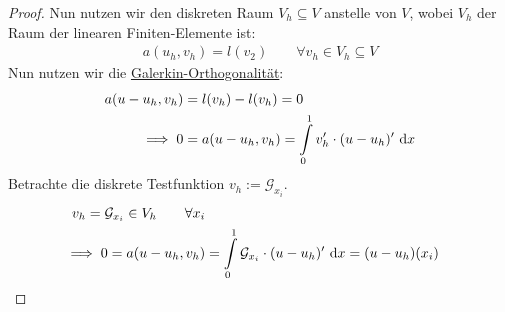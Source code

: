 \documentclass[12pt,a4paper]{article}
\newcommand{\G}{\mathcal{G}}
\begin{document}
\begin{proof}
Nun nutzen wir den diskreten Raum $V_h\subseteq V$ anstelle von $V$, wobei $V_h$ der Raum der linearen Finiten-Elemente ist:
\begin{align*}
a(u_h,v_h)=l(v_2)\qquad\forall v_h\in V_h\subseteq V
\end{align*}
Nun nutzen wir die \ul{Galerkin-Orthogonalität}:
\begin{align*}
a(u-u_h,v_h)
&=l(v_h)-l(v_h)=0\\
\implies 0
&=a(u-u_h,v_h)
=\int\limits_0^1 v_h'\cdot(u-u_h)'\text{ d} x
\end{align*}
Betrachte die diskrete Testfunktion $v_h:=\G_{x_i}$.
\begin{align*}
v_h=\G_{x_i}\in V_h\qquad\forall x_i\\
\implies
0=a(u-u_h,v_h)
&=\int\limits_0^1\G_{x_i}\cdot(u-u_h)'\d x=(u-u_h)(x_i)
\end{align*}
\end{proof}
\end{document}
